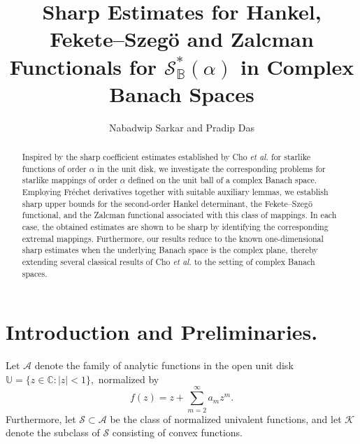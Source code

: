 \documentclass[11pt, reqno]{amsart}
\numberwithin{equation}{section}
\begin{document}
\title[Sharp Estimates for Hankel, Fekete--Szeg\"o and Zalcman Functionals for $\mathcal{S}_\mathbb{B}^{*}(\alpha)$...]{Sharp Estimates for Hankel, Fekete--Szeg\"o and Zalcman Functionals for $\mathcal{S}_\mathbb{B}^{*}(\alpha)$ in Complex Banach Spaces}
\author[ N. Sarkar and P. Das]{Nabadwip Sarkar and Pradip Das}
\address{Amity School of Applied Sciences, Amity University Mumbai, Panvel, Navi Mumbai, Maharashtra-410206, India}
\address{Department of Mathematics, Raiganj University, Raiganj, West Bengal-733134, India.}

\makeatletter
{}
\makeatother

\begin{abstract}
Inspired by the sharp coefficient estimates established by Cho \emph{et al.}\cite{CKKLS2018} for starlike functions of order $\alpha$ in the unit disk, we investigate the corresponding problems for starlike mappings of order $\alpha$ defined on the unit ball of a complex Banach space. Employing Fr\'echet derivatives together with suitable auxiliary lemmas, we establish sharp upper bounds for the second-order Hankel determinant, the Fekete--Szeg\"o functional, and the Zalcman functional associated with this class of mappings. In each case, the obtained estimates are shown to be sharp by identifying the corresponding extremal mappings. Furthermore, our results reduce to the known one-dimensional sharp estimates when the underlying Banach space is the complex plane, thereby extending several classical results of Cho \emph{et al.} \cite{CKKLS2018}  to the setting of complex Banach spaces.
\end{abstract}

\maketitle

\section{{\bf Introduction and Preliminaries.}}

Let $\mathcal{A}$ denote the family of analytic functions in the open unit disk $\mathbb{U}=\{z\in\mathbb{C}:|z|<1\},$
normalized by
\begin{equation}\label{eq:A}
f(z)=z+\sum_{m=2}^{\infty}a_mz^m.
\end{equation}
Furthermore, let $\mathcal{S}\subset\mathcal{A}$ be the class of normalized univalent functions, and let $\mathcal{K}$ denote the subclass of $\mathcal{S}$ consisting of convex functions.
\end{document}

